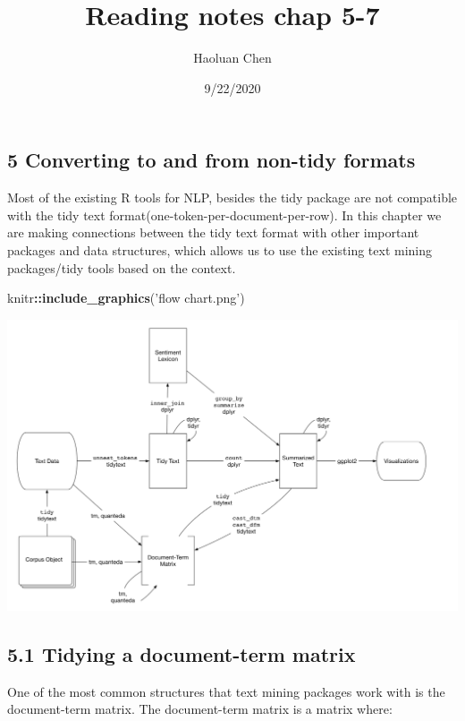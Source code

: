 \documentclass[]{article}
\title{Reading notes chap 5-7}
\author{Haoluan Chen}
\date{9/22/2020}
\newenvironment{Shaded}{\begin{snugshade}}{\end{snugshade}}
\newcommand{\KeywordTok}[1]{\textcolor[rgb]{0.13,0.29,0.53}{\textbf{#1}}}
\newcommand{\NormalTok}[1]{#1}
\newcommand{\OperatorTok}[1]{\textcolor[rgb]{0.81,0.36,0.00}{\textbf{#1}}}
\newcommand{\StringTok}[1]{\textcolor[rgb]{0.31,0.60,0.02}{#1}}
\begin{document}
\maketitle

\hypertarget{converting-to-and-from-non-tidy-formats}{%
\subsection{5 Converting to and from non-tidy
formats}\label{converting-to-and-from-non-tidy-formats}}

Most of the existing R tools for NLP, besides the tidy package are not
compatible with the tidy text format(one-token-per-document-per-row). In
this chapter we are making connections between the tidy text format with
other important packages and data structures, which allows us to use the
existing text mining packages/tidy tools based on the context.

\begin{Shaded}
\begin{Highlighting}[]
\NormalTok{knitr}\OperatorTok{::}\KeywordTok{include_graphics}\NormalTok{(}\StringTok{'flow chart.png'}\NormalTok{)}
\end{Highlighting}
\end{Shaded}

\includegraphics[width=22.06in]{flow chart}

\hypertarget{tidying-a-document-term-matrix}{%
\subsection{5.1 Tidying a document-term
matrix}\label{tidying-a-document-term-matrix}}

One of the most common structures that text mining packages work with is
the document-term matrix. The document-term matrix is a matrix where:
\end{document}
